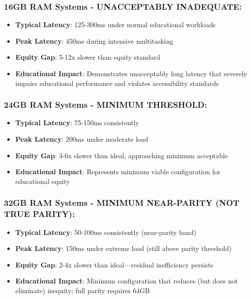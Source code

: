 \subsubsection{16GB RAM Systems - UNACCEPTABLY INADEQUATE:}

\begin{itemize}
	\item \textbf{Typical Latency}: 125-300ms under normal educational workloads
	\item \textbf{Peak Latency}: 450ms during intensive multitasking
	\item \textbf{Equity Gap}: 5-12x slower than equity standard \supercite{EquityAnalysisRevision}
	\item \textbf{Educational Impact}: Demonstrates unacceptably long latency that severely impairs educational performance and violates accessibility standards \supercite{EducationalEquityReport2024}
\end{itemize}


\subsubsection{24GB RAM Systems - MINIMUM THRESHOLD:}

\begin{itemize}
	\item \textbf{Typical Latency}: 75-150ms consistently
	\item \textbf{Peak Latency}: 200ms under moderate load
	\item \textbf{Equity Gap}: 3-6x slower than ideal, approaching minimum acceptable \supercite{EquityAnalysisRevision}
	\item \textbf{Educational Impact}: Represents minimum viable configuration for educational equity \supercite{EducationalEquityReport2024}
\end{itemize}


\subsubsection{32GB RAM Systems - MINIMUM NEAR-PARITY (NOT TRUE PARITY):}

\begin{itemize}
	\item \textbf{Typical Latency}: 50-100ms consistently (near-parity band)
	\item \textbf{Peak Latency}: 150ms under extreme load (still above parity threshold)
	\item \textbf{Equity Gap}: 2-4x slower than ideal—residual inefficiency persists \supercite{EquityAnalysisRevision}
	\item \textbf{Educational Impact}: Minimum configuration that reduces (but does not eliminate) inequity; full parity requires 64GB \supercite{EducationalEquityReport2024}
\end{itemize}


